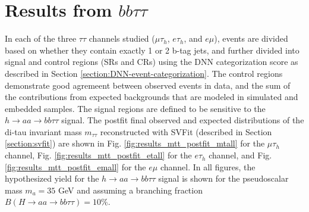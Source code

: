 \section{Results from \texorpdfstring{$bb\tau\tau$}{bbtautau}}

In each of the three $\tau\tau$ channels studied ($\mu\tau_{h}$, $e\tau_{h}$, and $e\mu$), events are divided based on whether they contain exactly 1 or 2 b-tag jets, and further divided into signal and control regions (SRs and CRs) using the DNN categorization score as described in Section \ref{section:DNN-event-categorization}. The control regions demonstrate good agremeent between observed events in data, and the sum of the contributions from expected backgrounds that are modeled in simulated and embedded samples. The signal regions are defined to be sensitive to the $h \rightarrow aa \rightarrow bb\tau\tau$ signal. The postfit final observed and expected distributions of the di-tau invariant mass $m_{\tau\tau}$ reconstructed with SVFit (described in Section \ref{section:svfit}) are shown in Fig. \ref{fig:results_mtt_postfit_mtall} for the $\mu\tau_{h}$ channel, Fig. \ref{fig:results_mtt_postfit_etall} for the $e\tau_{h}$ channel, and Fig. \ref{fig:results_mtt_postfit_emall} for the $e\mu$ channel. In all figures, the hypothesized yield for the $h\rightarrow aa \rightarrow bb\tau\tau$ signal is shown for the pseudoscalar mass $m_a = 35$ GeV and assuming a branching fraction $B(H \rightarrow aa \rightarrow bb\tau\tau) = 10\%$.
